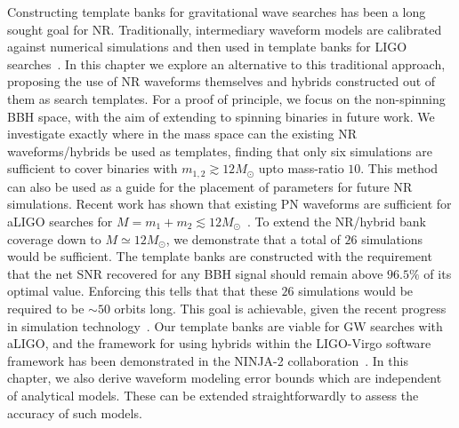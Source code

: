 Constructing template banks for gravitational wave searches has
been a long sought goal for NR. Traditionally, intermediary waveform
models are calibrated against numerical simulations and then
used in template banks for LIGO searches~\cite{Abadie:2011kd,
Aasi:2012rja}. In this chapter we explore an alternative to this
traditional approach, proposing the use of NR waveforms themselves
and hybrids constructed out of them as search templates.
For a proof of principle, we focus on the non-spinning BBH space, 
with the aim of extending to spinning binaries in future work. We
investigate exactly where in the mass space can the existing NR 
waveforms/hybrids be used as templates, finding that only six 
simulations are sufficient to cover binaries with 
$m_{1,2}\gtrsim 12M_\odot$ upto mass-ratio $10$. This method can
also be used as a guide for the placement of parameters for future
NR simulations. Recent work has shown that existing PN waveforms 
are sufficient for aLIGO searches for 
$M=m_1+m_2\lesssim 12M_\odot$~\cite{CompTemplates2009,Brown:2012nn}.
To extend the NR/hybrid bank coverage down to 
$M\simeq 12M_\odot$, we demonstrate that a total of $26$ 
simulations would be sufficient. The template banks are 
constructed with the requirement that the net SNR recovered for 
any BBH signal should remain above $96.5\%$ of its optimal value.
Enforcing this tells that that these $26$ simulations would be 
required to be $\sim 50$ orbits long. This goal is achievable,
given the recent progress in simulation 
technology~\cite{MacDonald:2012mp,Mroue:2013xna,BelaLongSimulation}. 
Our template banks are viable for GW searches with aLIGO, and the 
framework for using hybrids within the LIGO-Virgo software 
framework has been demonstrated in the NINJA-2
collaboration~\cite{NINJA2:2013inPrep}. In this chapter, we also 
derive waveform modeling error bounds which are independent of
analytical models. These can be extended straightforwardly to 
assess the accuracy of such models.


